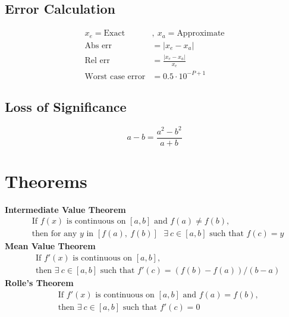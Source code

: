 \documentclass[10pt]{article}
\begin{document}
\begin{multicols}{2}
\begin{minipage}{\columnwidth}
        \subsection*{Error Calculation}
        \begin{align*}
            x_e = \text{Exact}      & ,\ x_a = \text{Approximate}                  \\
            \text{Abs err}          & = \left| x_{e} - x_{a} \right|               \\
            \text{Rel err}          & = \frac{\left| x_{e} - x_{a} \right|}{x_{e}} \\
            \text{Worst case error} & = 0.5 \cdot 10^{-P+1}
        \end{align*}
        \subsection*{Loss of Significance}
        \begin{equation*}
            a - b = \frac{a^2-b^2}{a+b}
        \end{equation*}
        \section*{Theorems}
        \textbf{Intermediate Value Theorem}
        \begin{equation*}
            \begin{aligned}
                 & \text{If } f(x) \text{ is continuous on } [a,b] \text{ and } f(a) \neq f(b) \text{,}              \\
                 & \text{then for any \(y\) in \([f(a),\ f(b)] \) } \exists\ c \in [a,b] \text{ such that } f(c) = y
            \end{aligned}
        \end{equation*}
        \textbf{Mean Value Theorem}
        \begin{equation*}
            \begin{aligned}
                 & \text{If } f'(x) \text{ is continuous on } [a,b] \text{,}                      \\
                 & \text{then } \exists\ c \in [a,b] \text{ such that } f'(c) = (f(b)-f(a))/(b-a)
            \end{aligned}
        \end{equation*}
        \textbf{Rolle's Theorem}
        \begin{equation*}
            \begin{aligned}
                 & \text{If } f'(x) \text{ is continuous on } [a,b] \text{ and } f(a) = f(b) \text{,} \\
                 & \text{then } \exists\ c \in [a,b] \text{ such that } f'(c) = 0
            \end{aligned}
        \end{equation*}

\end{minipage}
\end{multicols}
\end{document}
